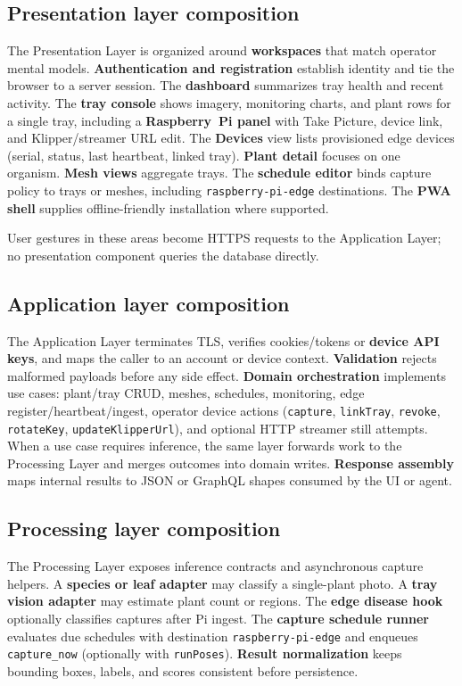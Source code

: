 \subsection{Presentation layer composition}

The Presentation Layer is organized around \textbf{workspaces} that match operator mental models. \textbf{Authentication and registration} establish identity and tie the browser to a server session. The \textbf{dashboard} summarizes tray health and recent activity. The \textbf{tray console} shows imagery, monitoring charts, and plant rows for a single tray, including a \textbf{Raspberry~Pi panel} with Take Picture, device link, and Klipper/streamer URL edit. The \textbf{Devices} view lists provisioned edge devices (serial, status, last heartbeat, linked tray). \textbf{Plant detail} focuses on one organism. \textbf{Mesh views} aggregate trays. The \textbf{schedule editor} binds capture policy to trays or meshes, including \texttt{raspberry-pi-edge} destinations. The \textbf{PWA shell} supplies offline-friendly installation where supported.

User gestures in these areas become HTTPS requests to the Application Layer; no presentation component queries the database directly.

\subsection{Application layer composition}

The Application Layer terminates TLS, verifies cookies/tokens or \textbf{device API keys}, and maps the caller to an account or device context. \textbf{Validation} rejects malformed payloads before any side effect. \textbf{Domain orchestration} implements use cases: plant/tray CRUD, meshes, schedules, monitoring, edge register/heartbeat/ingest, operator device actions (\texttt{capture}, \texttt{linkTray}, \texttt{revoke}, \texttt{rotateKey}, \texttt{updateKlipperUrl}), and optional HTTP streamer still attempts. When a use case requires inference, the same layer forwards work to the Processing Layer and merges outcomes into domain writes. \textbf{Response assembly} maps internal results to JSON or GraphQL shapes consumed by the UI or agent.

\subsection{Processing layer composition}

The Processing Layer exposes inference contracts and asynchronous capture helpers. A \textbf{species or leaf adapter} may classify a single-plant photo. A \textbf{tray vision adapter} may estimate plant count or regions. The \textbf{edge disease hook} optionally classifies captures after Pi ingest. The \textbf{capture schedule runner} evaluates due schedules with destination \texttt{raspberry-pi-edge} and enqueues \texttt{capture\_now} (optionally with \texttt{runPoses}). \textbf{Result normalization} keeps bounding boxes, labels, and scores consistent before persistence.

